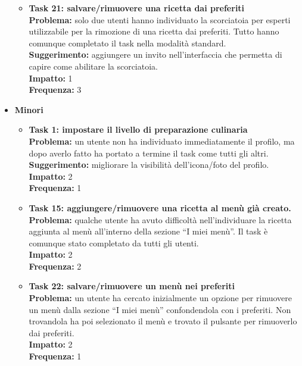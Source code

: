 \begin{itemize}
\begin{itemize}
			\item \textbf{Task 21: salvare/rimuovere una ricetta dai preferiti}\\
				\textbf{Problema:} solo due utenti hanno individuato la scorciatoia per
				esperti utilizzabile per la rimozione di una ricetta dai preferiti.
				Tutto hanno comunque completato il task nella modalità standard.\\
				\textbf{Suggerimento:} aggiungere un invito
				nell'interfaccia che permetta di capire come abilitare la scorciatoia.\\
				\textbf{Impatto:} 1\\
				\textbf{Frequenza:} 3\\
		\end{itemize}
		
	\item \textbf{Minori}
		\begin{itemize}
			\item \textbf{Task 1: impostare il livello di preparazione culinaria}\\
				\textbf{Problema:} un utente non ha individuato immediatamente il
				profilo, ma dopo averlo fatto ha portato a termine il task come tutti
				gli altri.\\
				\textbf{Suggerimento:} migliorare la visibilità dell'icona/foto del profilo.\\
				\textbf{Impatto:} 2\\
				\textbf{Frequenza:} 1\\


			\item \textbf{Task 15: aggiungere/rimuovere una ricetta al menù già creato.}\\
				\textbf{Problema:} qualche utente ha avuto difficoltà nell'individuare la
				ricetta aggiunta al menù all'interno della sezione ``I miei menù''. Il
				task è comunque stato completato da tutti gli utenti.\\
				\textbf{Impatto:} 2\\
				\textbf{Frequenza:} 2\\
			
			\item \textbf{Task 22: salvare/rimuovere un menù nei preferiti}\\
				\textbf{Problema:} un utente ha cercato inizialmente un opzione per
				rimuovere un menù dalla sezione ``I miei menù'' confondendola con i
				preferiti. Non trovandola ha
				poi selezionato il menù e trovato il pulsante per rimuoverlo dai
				preferiti.\\
				\textbf{Impatto:} 2\\
				\textbf{Frequenza:} 1\\
		\end{itemize}


\end{itemize}

